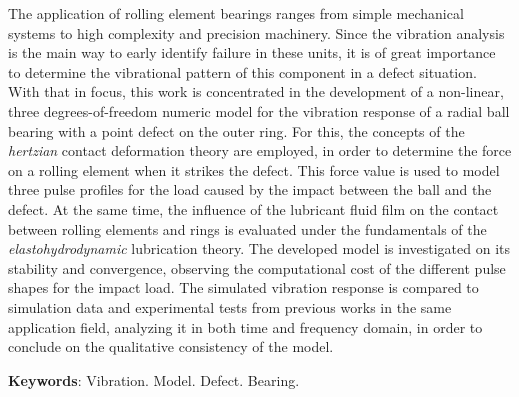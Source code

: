 The application of rolling element bearings ranges from simple mechanical systems to high complexity and precision machinery.
Since the vibration analysis is the main way to early identify failure in these units, it is of great importance to determine the vibrational pattern of this component in a defect situation.
With that in focus, this work is concentrated in the development of a non-linear, three degrees-of-freedom numeric model for the vibration response of a radial ball bearing with a point defect on the outer ring.
For this, the concepts of the \emph{hertzian} contact deformation theory are employed, in order to determine the force on a rolling element when it strikes the defect.
This force value is used to model three pulse profiles for the load caused by the impact between the ball and the defect.
At the same time, the influence of the lubricant fluid film on the contact between rolling elements and rings is evaluated under the fundamentals of the \emph{elastohydrodynamic} lubrication theory.
The developed model is investigated on its stability and convergence, observing the computational cost of the different pulse shapes for the impact load.
The simulated vibration response is compared to simulation data and experimental tests from previous works in the same application field, analyzing it in both time and frequency domain, in order to conclude on the qualitative consistency of the model.
\vspace{\onelineskip}

\noindent
\textbf{Keywords}: Vibration. Model. Defect. Bearing.
